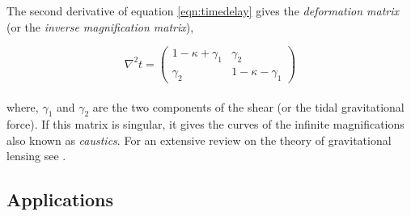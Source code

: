 The second derivative of equation \ref{eqn:timedelay} gives the
{\it deformation matrix} (or the {\it inverse magnification matrix}),

\begin{equation}
	\nabla^2 t = \begin{pmatrix}
 				 1-\kappa+\gamma_1 &  \gamma_2 \\
  					\gamma_2 & 1-\kappa-\gamma_1
 				\end{pmatrix}
\end{equation}
\\
where, $\gamma_1$ and $\gamma_2$ are the two components of the shear (or the tidal
gravitational force). If this matrix is singular, it gives the curves of the
infinite magnifications also known as {\it caustics}.
For an extensive review on the theory of gravitational
lensing see \citep{1992grle.book.....S,2001stgl.book.....P,2006glsw.conf.....M}.


\subsection{Applications}

